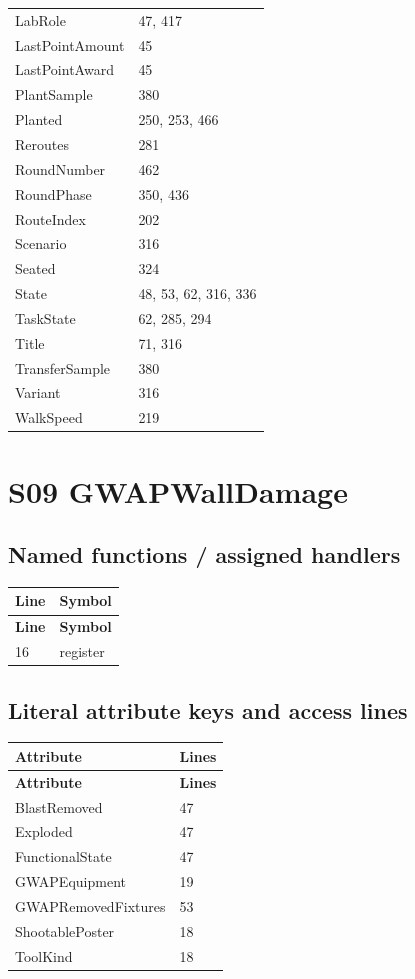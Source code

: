 \begin{longtable}{p{}p{}}
LabRole & 47, 417 \\
LastPointAmount & 45 \\
LastPointAward & 45 \\
PlantSample & 380 \\
Planted & 250, 253, 466 \\
Reroutes & 281 \\
RoundNumber & 462 \\
RoundPhase & 350, 436 \\
RouteIndex & 202 \\
Scenario & 316 \\
Seated & 324 \\
State & 48, 53, 62, 316, 336 \\
TaskState & 62, 285, 294 \\
Title & 71, 316 \\
TransferSample & 380 \\
Variant & 316 \\
WalkSpeed & 219 \\
\bottomrule
\end{longtable}
\section{S09 GWAPWallDamage}
\subsection{Named functions /\allowbreak{} assigned handlers}
\begin{longtable}{p{}p{}}
\toprule
\textbf{Line} & \textbf{Symbol} \\ \midrule
\endfirsthead
\textbf{Line} & \textbf{Symbol} \\ \midrule
\endhead
16 & register \\
\bottomrule
\end{longtable}
\subsection{Literal attribute keys and access lines}
\begin{longtable}{p{}p{}}
\toprule
\textbf{Attribute} & \textbf{Lines} \\ \midrule
\endfirsthead
\textbf{Attribute} & \textbf{Lines} \\ \midrule
\endhead
BlastRemoved & 47 \\
Exploded & 47 \\
FunctionalState & 47 \\
GWAPEquipment & 19 \\
GWAPRemovedFixtures & 53 \\
ShootablePoster & 18 \\
ToolKind & 18 \\
\bottomrule
\end{longtable}
